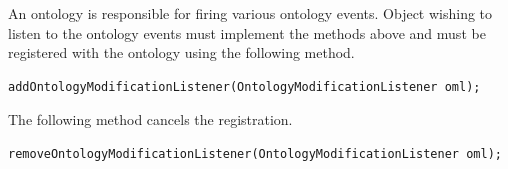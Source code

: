 An ontology is responsible for firing various ontology events. Object wishing to
listen to the ontology events must implement the methods above and must be
registered with the ontology using the following method.
\begin{small}\begin{verbatim}
addOntologyModificationListener(OntologyModificationListener oml);
\end{verbatim}\end{small}
The following method cancels the registration.
\begin{small}\begin{verbatim}
removeOntologyModificationListener(OntologyModificationListener oml);
\end{verbatim}\end{small}


